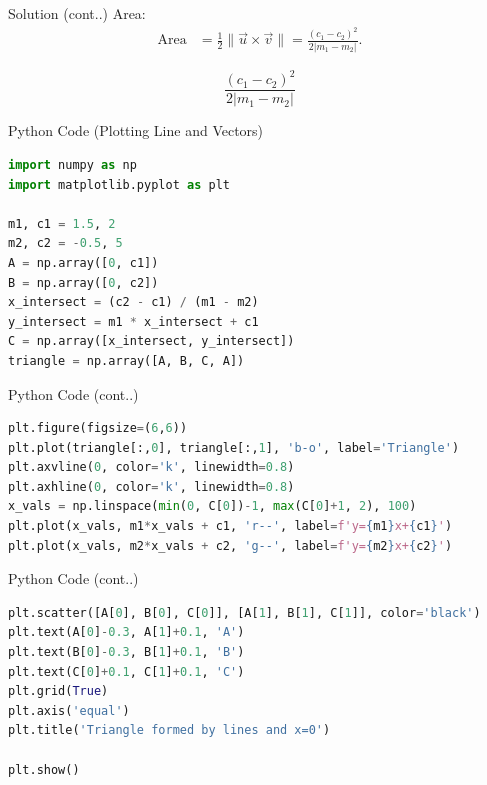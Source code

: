 \documentclass{beamer}
\begin{document}
\begin{frame}{Solution (cont..)}
Area:
\begin{align}
\text{Area} &= \tfrac{1}{2} \|\vec{u} \times \vec{v}\| = \frac{(c_1-c_2)^2}{2|m_1-m_2|}.
\end{align}

\[
\boxed{\frac{(c_1-c_2)^2}{2|m_1-m_2|}}
\]
\end{frame}

\begin{frame}[fragile]{Python Code (Plotting Line and Vectors)}
\begin{lstlisting}[language=Python]
import numpy as np
import matplotlib.pyplot as plt

m1, c1 = 1.5, 2 
m2, c2 = -0.5, 5     
A = np.array([0, c1])
B = np.array([0, c2])
x_intersect = (c2 - c1) / (m1 - m2)
y_intersect = m1 * x_intersect + c1
C = np.array([x_intersect, y_intersect])
triangle = np.array([A, B, C, A]) 
\end{lstlisting}
\end{frame}

\begin{frame}[fragile]{Python Code (cont..)}
\begin{lstlisting}[language=Python]
plt.figure(figsize=(6,6))
plt.plot(triangle[:,0], triangle[:,1], 'b-o', label='Triangle')
plt.axvline(0, color='k', linewidth=0.8) 
plt.axhline(0, color='k', linewidth=0.8) 
x_vals = np.linspace(min(0, C[0])-1, max(C[0]+1, 2), 100)
plt.plot(x_vals, m1*x_vals + c1, 'r--', label=f'y={m1}x+{c1}')
plt.plot(x_vals, m2*x_vals + c2, 'g--', label=f'y={m2}x+{c2}')
\end{lstlisting}
\end{frame}

\begin{frame}[fragile]{Python Code (cont..)}
\begin{lstlisting}[language=Python]
plt.scatter([A[0], B[0], C[0]], [A[1], B[1], C[1]], color='black')
plt.text(A[0]-0.3, A[1]+0.1, 'A')
plt.text(B[0]-0.3, B[1]+0.1, 'B')
plt.text(C[0]+0.1, C[1]+0.1, 'C')
plt.grid(True)
plt.axis('equal')
plt.title('Triangle formed by lines and x=0')

plt.show()
\end{lstlisting}
\end{frame}
\end{document}

